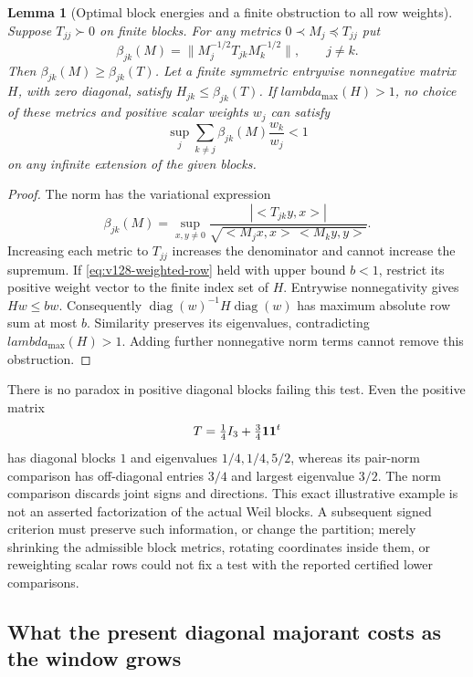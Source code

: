 \documentclass[11pt]{article}
\def\lambda{lambda}%
\def\ip#1#2{<#1,#2>}%
\newtheorem{lemma}[theorem]{Lemma}
\theoremstyle{remark}
\newcommand{\ip}[2]{\left\langle #1,#2\right\rangle}
\begin{document}
\begin{lemma}[Optimal block energies and a finite obstruction to all row weights]
\label{lem:v128-comparison-obstruction}
Suppose $T_{jj}\succ0$ on finite blocks. For any metrics
$0\prec M_j\preceq T_{jj}$ put
\[
 \beta_{jk}(M)=\|M_j^{-1/2}T_{jk}M_k^{-1/2}\|,\qquad j\ne k.
\]
Then $\beta_{jk}(M)\ge\beta_{jk}(T)$. Let a finite symmetric
entrywise nonnegative matrix $H$, with zero diagonal, satisfy
$H_{jk}\le\beta_{jk}(T)$. If $\lambda_{\max}(H)>1$, no choice of
these metrics and positive scalar weights $w_j$ can satisfy
\begin{equation}\label{eq:v128-weighted-row}
 \sup_j\sum_{k\ne j}\beta_{jk}(M)\frac{w_k}{w_j}<1
\end{equation}
on any infinite extension of the given blocks.
\end{lemma}
\begin{proof}
The norm has the variational expression
\[
 \beta_{jk}(M)=\sup_{x,y\ne0}
 \frac{|\ip{T_{jk}y}{x}|}
 {\sqrt{\ip{M_jx}{x}\,\ip{M_ky}{y}}}.
\]
Increasing each metric to $T_{jj}$ increases the denominator and
cannot increase the supremum. If \eqref{eq:v128-weighted-row} held
with upper bound $b<1$, restrict its positive weight vector to the
finite index set of $H$. Entrywise nonnegativity gives $Hw\le bw$.
Consequently $\operatorname{diag}(w)^{-1}H\operatorname{diag}(w)$
has maximum absolute row sum at most $b$. Similarity preserves its
eigenvalues, contradicting $\lambda_{\max}(H)>1$. Adding further
nonnegative norm terms cannot remove this obstruction.
\end{proof}


There is no paradox in positive diagonal blocks failing this test.
Even the positive matrix
\[
 T=\tfrac14 I_3+\tfrac34{\bf1}{\bf1}^t
\]
has diagonal blocks $1$ and eigenvalues $1/4,1/4,5/2$, whereas its
pair-norm comparison has off-diagonal entries $3/4$ and largest
eigenvalue $3/2$. The norm comparison discards joint signs and
directions. This exact illustrative example is not an asserted
factorization of the actual Weil blocks. A subsequent signed
criterion must preserve such information, or change the partition;
merely shrinking the admissible block metrics, rotating coordinates
inside them, or reweighting scalar rows could not fix a test with the
reported certified lower comparisons.


\subsection{What the present diagonal majorant costs as the window grows}
\end{document}
